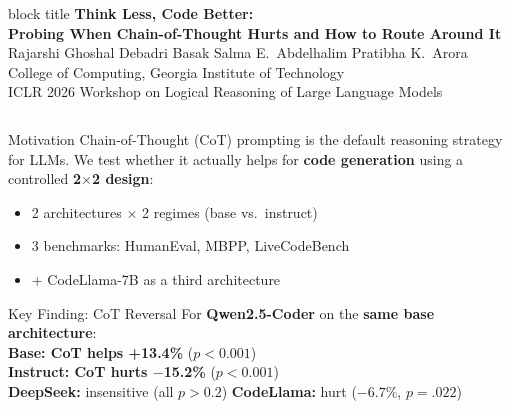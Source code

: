 \documentclass[final]{beamer}
\newlength{\colwidth}\setlength{\colwidth}{0.46\textwidth}
\begin{document}
\begin{frame}[t]

\begin{beamercolorbox}[wd=\textwidth,sep=0.8cm]{block title}
\centering
{\Huge\bfseries Think Less, Code Better:\\[0.2em]
Probing When Chain-of-Thought Hurts and How to Route Around It}\\[0.6em]
{\Large Rajarshi Ghoshal \quad Debadri Basak \quad Salma E.\ Abdelhalim \quad Pratibha K.\ Arora}\\[0.2em]
{\large College of Computing, Georgia Institute of Technology}\\[0.2em]
{\normalsize ICLR 2026 Workshop on Logical Reasoning of Large Language Models}
\end{beamercolorbox}

\vspace{0.6cm}

\begin{columns}[t]

\begin{column}{\colwidth}

\begin{block}{Motivation}
Chain-of-Thought (CoT) prompting is the default reasoning strategy for LLMs. We test whether it actually helps for \textbf{code generation} using a controlled \textbf{2$\times$2 design}:
\begin{itemize}
    \item 2 architectures $\times$ 2 regimes (base vs.\ instruct)
    \item 3 benchmarks: HumanEval, MBPP, LiveCodeBench
    \item + CodeLlama-7B as a third architecture
\end{itemize}
\end{block}

\vspace{0.5cm}

\begin{alertblock}{\centering Key Finding: CoT Reversal}
\centering
\vspace{0.3em}
For \textbf{Qwen2.5-Coder} on the \textbf{same base architecture}:\\[0.4em]
{\LARGE\color{posgreen}\textbf{Base: CoT helps +13.4\%}} {\large($p<0.001$)}\\[0.3em]
{\LARGE\color{negred}\textbf{Instruct: CoT hurts $-$15.2\%}} {\large($p<0.001$)}\\[0.5em]
\textbf{DeepSeek:} insensitive (all $p>0.2$) \quad \textbf{CodeLlama:} hurt ($-6.7\%$, $p=.022$)\\[0.3em]
\end{alertblock}


\end{column}
\end{columns}
\end{frame}
\end{document}
